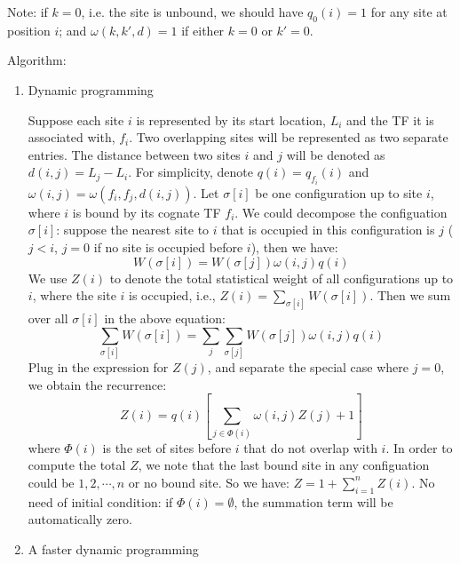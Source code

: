 \documentclass[11pt]{article}
\begin{document}
\begin{enumerate}
\begin{enumerate}
\end{enumerate}

Note: if $k = 0$, i.e. the site is unbound, we should have $q_0(i) = 1$ for any site at position $i$; and $\omega(k,k',d) = 1$ if either $k = 0$ or $k' = 0$. 

Algorithm: 

\begin{enumerate}

\item {Dynamic programming}

Suppose each site $i$ is represented by its start location, $L_i$ and the TF it is associated with, $f_i$. Two overlapping sites will be represented as two separate entries. The distance between two sites $i$ and $j$ will be denoted as $d(i,j) = L_j - L_i$. For simplicity, denote $q(i) = q_{f_i}(i)$ and $\omega(i,j) = \omega(f_i, f_j, d(i,j))$. Let $\sigma[i]$ be one configuration up to site $i$, where $i$ is bound by its cognate TF $f_i$. We could decompose the configuation $\sigma[i]$: suppose the nearest site to $i$ that is occupied in this configuration is $j$ ($j < i$, $j = 0$ if no site is occupied before $i$), then we have:
\begin{equation}
W(\sigma[i]) = W(\sigma[j]) \omega(i, j) q(i)
\end{equation}
We use $Z(i)$ to denote the total statistical weight of all configurations up to $i$, where the site $i$ is occupied, i.e., $Z(i) = \sum_{\sigma[i]}W(\sigma[i])$. Then we sum over all $\sigma[i]$ in the above equation: 
\begin{equation}
\sum_{\sigma[i]}W(\sigma[i]) = \sum_{j}{\sum_{\sigma[j]}W(\sigma[j]) \omega(i, j) q(i)}
\end{equation}
Plug in the expression for $Z(j)$, and separate the special case where $j=0$, we obtain the recurrence: 
\begin{equation}
Z(i) = q(i) \left[ \sum_{j \in \Phi (i)}{\omega(i, j) Z(j)} + 1 \right]
\label{eq:part_func_off}
\end{equation}
where $\Phi (i)$ is the set of sites before $i$ that do not overlap with $i$. In order to compute the total $Z$, we note that the last bound site in any configuation could be $1,2,\cdots,n$ or no bound site. So we have: $Z = 1 + \sum_{i=1}^{n}Z(i)$. No need of initial condition: if $\Phi (i) = \emptyset$, the summation term will be automatically zero. 

\item{A faster dynamic programming} 


\end{enumerate}
\end{enumerate}
\end{document}
